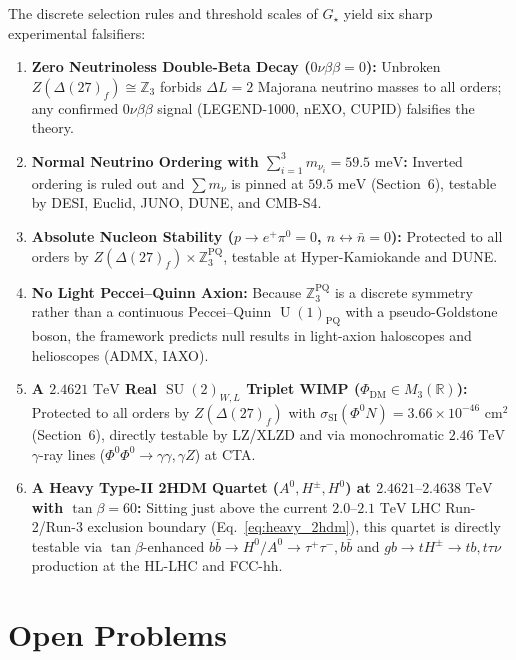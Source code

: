 \documentclass[11pt,a4paper]{article}
\theoremstyle{definition}
\theoremstyle{remark}
\newcommand{\R}{\mathbb{R}}
\newcommand{\Z}{\mathbb{Z}}
\newcommand{\SU}{\operatorname{SU}}
\newcommand{\U}{\operatorname{U}}
\newcommand{\Gstar}{G_\star}
\begin{document}
The discrete selection rules and threshold scales of $\Gstar$ yield six sharp experimental falsifiers:
\begin{enumerate}
    \item \textbf{Zero Neutrinoless Double-Beta Decay ($0\nu\beta\beta = 0$):} Unbroken $Z(\Delta(27)_f) \cong \Z_3$ forbids $\Delta L = 2$ Majorana neutrino masses to all orders; any confirmed $0\nu\beta\beta$ signal (LEGEND-1000, nEXO, CUPID) falsifies the theory.
    \item \textbf{Normal Neutrino Ordering with $\sum_{i=1}^3 m_{\nu_i} = 59.5\text{ meV}$:} Inverted ordering is ruled out and $\sum m_\nu$ is pinned at $59.5\text{ meV}$ (Section~6), testable by DESI, Euclid, JUNO, DUNE, and CMB-S4.
    \item \textbf{Absolute Nucleon Stability ($p \to e^+\pi^0 = 0$, $n \leftrightarrow \bar{n} = 0$):} Protected to all orders by $Z(\Delta(27)_f) \times \Z_3^{\mathrm{PQ}}$, testable at Hyper-Kamiokande and DUNE.
    \item \textbf{No Light Peccei--Quinn Axion:} Because $\Z_3^{\mathrm{PQ}}$ is a discrete symmetry rather than a continuous Peccei--Quinn $\U(1)_{\mathrm{PQ}}$ with a pseudo-Goldstone boson, the framework predicts null results in light-axion haloscopes and helioscopes (ADMX, IAXO).
    \item \textbf{A $2.4621\text{ TeV}$ Real $\SU(2)_{W,L}$ Triplet WIMP ($\Phi_{\mathrm{DM}} \in M_3(\R)$):} Protected to all orders by $Z(\Delta(27)_f)$ with $\sigma_{\mathrm{SI}}(\Phi^0 N) = 3.66 \times 10^{-46}\text{ cm}^2$ (Section~6), directly testable by LZ/XLZD and via monochromatic $2.46\text{ TeV}$ $\gamma$-ray lines ($\Phi^0\Phi^0 \to \gamma\gamma, \gamma Z$) at CTA.
    \item \textbf{A Heavy Type-II 2HDM Quartet ($A^0, H^\pm, H^0$) at $2.4621\text{--}2.4638\text{ TeV}$ with $\tan\beta = 60$:} Sitting just above the current $2.0\text{--}2.1\text{ TeV}$ LHC Run-2/Run-3 exclusion boundary (Eq.~\eqref{eq:heavy_2hdm}), this quartet is directly testable via $\tan\beta$-enhanced $b\bar{b} \to H^0/A^0 \to \tau^+\tau^-, b\bar{b}$ and $gb \to tH^\pm \to tb, t\tau\nu$ production at the HL-LHC and FCC-hh.
\end{enumerate}

\section{Open Problems}
\label{sec:open_problems}
\end{document}
